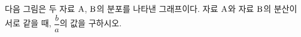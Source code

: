 다음 그림은 두 자료 $\mathrm{A}$, $\mathrm{B}$의 분포를 나타낸 그래프이다. 자료 $\mathrm{A}$와 자료 $\mathrm{B}$의 분산이 서로 같을 때, $\dfrac{b}{a}$의 값을 구하시오. 
\par\smallskip\begin{center}\resizebox{\ifdim\width>\linewidth\linewidth\else\width\fi}{!}{}\end{center}
